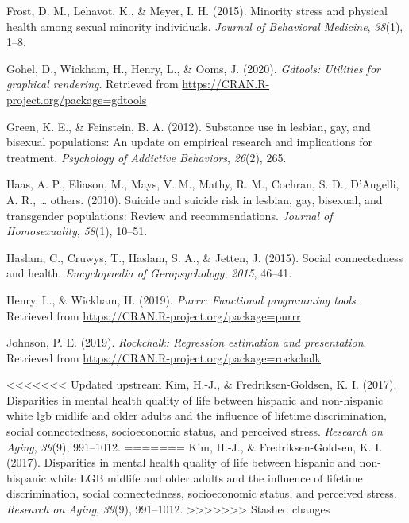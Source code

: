 \documentclass[
  english,
  man,floatsintext]{apa6}
\begin{document}
\begin{CSLReferences}{1}{0}
\leavevmode\hypertarget{ref-frost2015}{}%
Frost, D. M., Lehavot, K., \& Meyer, I. H. (2015). Minority stress and physical health among sexual minority individuals. \emph{Journal of Behavioral Medicine}, \emph{38}(1), 1--8.

\leavevmode\hypertarget{ref-R-gdtools}{}%
Gohel, D., Wickham, H., Henry, L., \& Ooms, J. (2020). \emph{Gdtools: Utilities for graphical rendering}. Retrieved from \url{https://CRAN.R-project.org/package=gdtools}

\leavevmode\hypertarget{ref-green2012}{}%
Green, K. E., \& Feinstein, B. A. (2012). Substance use in lesbian, gay, and bisexual populations: An update on empirical research and implications for treatment. \emph{Psychology of Addictive Behaviors}, \emph{26}(2), 265.

\leavevmode\hypertarget{ref-haas2010}{}%
Haas, A. P., Eliason, M., Mays, V. M., Mathy, R. M., Cochran, S. D., D'Augelli, A. R., \ldots{} others. (2010). Suicide and suicide risk in lesbian, gay, bisexual, and transgender populations: Review and recommendations. \emph{Journal of Homosexuality}, \emph{58}(1), 10--51.

\leavevmode\hypertarget{ref-haslam2015}{}%
Haslam, C., Cruwys, T., Haslam, S. A., \& Jetten, J. (2015). Social connectedness and health. \emph{Encyclopaedia of Geropsychology}, \emph{2015}, 46--41.

\leavevmode\hypertarget{ref-R-purrr}{}%
Henry, L., \& Wickham, H. (2019). \emph{Purrr: Functional programming tools}. Retrieved from \url{https://CRAN.R-project.org/package=purrr}

\leavevmode\hypertarget{ref-R-rockchalk}{}%
Johnson, P. E. (2019). \emph{Rockchalk: Regression estimation and presentation}. Retrieved from \url{https://CRAN.R-project.org/package=rockchalk}

\leavevmode\hypertarget{ref-kim2017}{}%
<<<<<<< Updated upstream
Kim, H.-J., \& Fredriksen-Goldsen, K. I. (2017). Disparities in mental health quality of life between hispanic and non-hispanic white lgb midlife and older adults and the influence of lifetime discrimination, social connectedness, socioeconomic status, and perceived stress. \emph{Research on Aging}, \emph{39}(9), 991--1012.
=======
Kim, H.-J., \& Fredriksen-Goldsen, K. I. (2017). Disparities in mental health quality of life between hispanic and non-hispanic white LGB midlife and older adults and the influence of lifetime discrimination, social connectedness, socioeconomic status, and perceived stress. \emph{Research on Aging}, \emph{39}(9), 991--1012.
>>>>>>> Stashed changes


\end{CSLReferences}
\end{document}
